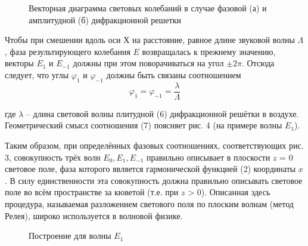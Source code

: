 \documentclass[14pt]{article}
\begin{document}
\begin{figure}[h!]
	\caption{Векторная диаграмма световых колебаний в случае фазовой (а) и амплитудной (б) дифракционной решетки}
	\label{fig:image}
\end{figure}

Чтобы при смешении вдоль оси Х на расстояние, равное длине звуковой волны $\Lambda$, фаза результирующего колебания $E$ возвращалась к прежнему значению, векторы $E_1$ и $E_{-1}$ должны при этом поворачиваться на угол $\pm 2\pi$. Отсюда следует, что углы $\varphi_1$ и $\varphi_{-1}$ должны быть связаны соотношением
\begin{equation}
	\varphi_1 = \varphi_{-1} = \frac{\lambda}{\Lambda}
\end{equation}

где $\lambda$ -- длина световой волны плитудной (6) дифракционной решётки в воздухе. Геометрический смысл соотношения (7) поясняет рис. 4 (на примере волны $E_1$).


Таким образом, при определённых фазовых соотношениях, соответствующих рис. 3, совокупность трёх волн $E_0, E_1, E_{-1}$ правильно описывает в плоскости $z$ = 0 световое поле, фаза которого является гармонической функцией (2) координаты $x$. В силу единственности эта совокупность должна правильно описывать световое поле во всём пространстве за кюветой (т.е. при $z$ > 0). Описанная здесь процедура, называемая разложением светового поля по плоским волнам (метод Релея), широко используется в волновой физике.

\begin{figure}[h!]
	\caption{Построение для волны $E_1$}
	\label{fig:image}
\end{figure}
\end{document}
